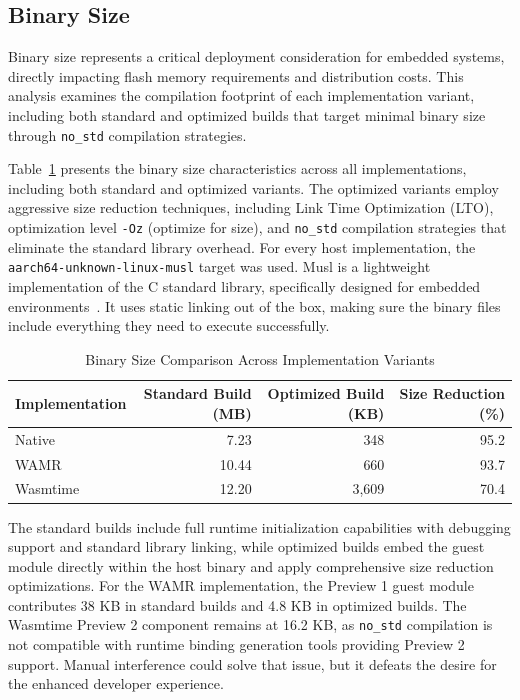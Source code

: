 \subsection{Binary Size}
\label{subsec:binary-size}

Binary size represents a critical deployment consideration for embedded systems, directly impacting flash memory requirements and distribution costs. This analysis examines the compilation footprint of each implementation variant, including both standard and optimized builds that target minimal binary size through \texttt{no\_std} compilation strategies.

Table~\ref{tab:binary-sizes} presents the binary size characteristics across all implementations, including both standard and optimized variants. The optimized variants employ aggressive size reduction techniques, including Link Time Optimization (LTO), optimization level \texttt{-Oz} (optimize for size), and \texttt{no\_std} compilation strategies that eliminate the standard library overhead. For every host implementation, the \texttt{aarch64-unknown-linux-musl} target was used. Musl is a lightweight implementation of the C standard library, specifically designed for embedded environments~\cite{musl}. It uses static linking out of the box, making sure the binary files include everything they need to execute successfully.

\begin{table}[H]
\centering
\caption{Binary Size Comparison Across Implementation Variants}
\label{tab:binary-sizes}
\begin{tabular}{lrrr}
\toprule
\textbf{Implementation} & \textbf{Standard Build (MB)} & \textbf{Optimized Build (KB)} & \textbf{Size Reduction (\%)} \\
\midrule
Native              & 7.23  & 348   & 95.2 \\
WAMR                & 10.44 & 660   & 93.7 \\
Wasmtime            & 12.20 & 3,609 & 70.4 \\
\bottomrule
\end{tabular}
\end{table}

The standard builds include full runtime initialization capabilities with debugging support and standard library linking, while optimized builds embed the guest module directly within the host binary and apply comprehensive size reduction optimizations. For the WAMR implementation, the Preview 1 guest module contributes 38 KB in standard builds and 4.8 KB in optimized builds. The Wasmtime Preview 2 component remains at 16.2 KB, as \texttt{no\_std} compilation is not compatible with runtime binding generation tools providing Preview 2 support. Manual interference could solve that issue, but it defeats the desire for the enhanced developer experience.

